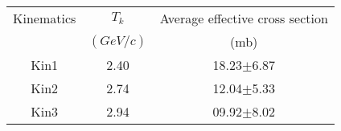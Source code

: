 \begin{center}
\begin{tabular}{||c|c|c||}\hline
 Kinematics & $T_k$ & Average effective cross section \\
 & $(GeV/c)$ & (mb)\\\hline
Kin1 & 2.40 &18.23$\pm$6.87 \\
Kin2 & 2.74 &12.04$\pm$5.33 \\
Kin3 & 2.94 &09.92$\pm$8.02 \\\hline
\end{tabular}
\end{center}